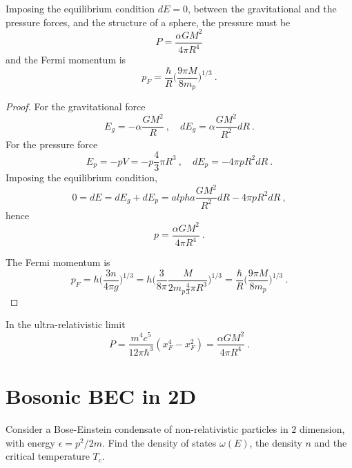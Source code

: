     Imposing the equilibrium condition $dE = 0$, between the gravitational and the pressure forces, and the structure of a sphere, the pressure must be 
    \begin{equation*}
        P = \frac{\alpha G M^2}{4 \pi R^4}
    \end{equation*}
    and the Fermi momentum is 
    \begin{equation*}
        p_F = \frac{\hbar}{R} \Big ( \frac{9 \pi M}{8 m_p} \Big)^{1/3} ~.
    \end{equation*}
    \begin{proof}
        For the gravitational force 
        \begin{equation*}
            E_g = - \alpha \frac{G M^2}{R} ~, \quad dE_g = \alpha \frac{GM^2}{R^2} dR ~.
        \end{equation*}
        For the pressure force 
        \begin{equation*}
            E_p = - p V = - p \frac{4}{3} \pi R^3 ~, \quad dE_p = - 4 \pi p R^2 dR ~.
        \end{equation*}
        Imposing the equilibrium condition, 
        \begin{equation*}
            0 = dE = dE_g + dE_p = alpha \frac{GM^2}{R^2} dR - 4 \pi p R^2 dR ~,
        \end{equation*}
        hence 
        \begin{equation*}
            p = \frac{\alpha G M^2}{4 \pi R^4} ~.
        \end{equation*}

        The Fermi momentum is 
        \begin{equation*}
            p_F = h \Big ( \frac{3 n}{4 \pi g} \Big)^{1/3} = h \Big ( \frac{3}{8 \pi} \frac{M}{2 m_p \frac{4}{3} \pi R^3} \Big)^{1/3} = \frac{\hbar}{R} \Big ( \frac{9 \pi M}{8 m_p} \Big)^{1/3}  ~.
        \end{equation*}
    \end{proof}

    In the ultra-relativistic limit
    \begin{equation*}
        P = \frac{m^4 c^5}{12 \pi \hbar^3} (x_F^4 - x_F^2) = \frac{\alpha G M^2}{4 \pi R^4} ~.
    \end{equation*}

\section{Bosonic BEC in 2D}

    \begin{exercise}
        Consider a Bose-Einstein condensate of non-relativistic particles in $2$ dimension, with energy $\epsilon = p^2 / 2m$.
        Find the density of states $\omega(E)$, the density $n$ and the critical temperature $T_c$.
    \end{exercise}

